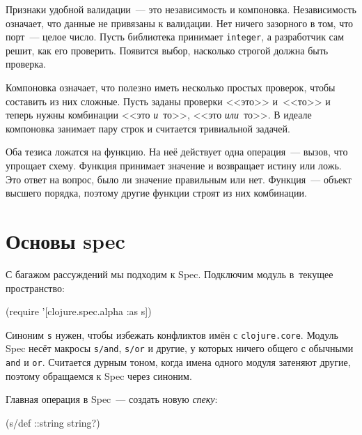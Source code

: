 
Признаки удобной валидации~--- это независимость и компоновка. Независимость
означает, что данные не привязаны к валидации. Нет ничего зазорного в том, что
порт~--- целое число. Пусть библиотека принимает \verb|integer|, а разработчик
сам решит, как его проверить. Появится выбор, насколько строгой должна быть
проверка.


Компоновка означает, что полезно иметь несколько простых проверок, чтобы
составить из них сложные. Пусть заданы проверки <<это>> и~<<то>> и теперь нужны
комбинации <<это \emph{и}~то>>, <<это \emph{или}~то>>. В идеале компоновка
занимает пару строк и считается тривиальной задачей.


Оба тезиса ложатся на функцию. На неё действует одна операция~--- вызов, что
упрощает схему. Функция принимает значение и возвращает истину или ложь. Это
ответ на вопрос, было ли значение правильным или нет. Функция~--- объект высшего
порядка, поэтому другие функции строят из них комбинации.

\section{Основы spec}

С багажом рассуждений мы подходим к Spec. Подключим модуль в~текущее
пространство:

\begin{english}
  \begin{clojure}
(require '[clojure.spec.alpha :as s])
  \end{clojure}
\end{english}

Синоним \verb|s| нужен, чтобы избежать конфликтов имён с
\verb|clojure.core|. Модуль Spec несёт макросы \verb|s/and|, \verb|s/or| и
другие, у которых ничего общего с обычными \verb|and| и \verb|or|. Считается
дурным тоном, когда имена одного модуля затеняют другие, поэтому обращаемся к
Spec через синоним.


Главная операция в Spec~--- создать новую \emph{спеку}:

\begin{english}
  \begin{clojure}
(s/def ::string string?)
  \end{clojure}
\end{english}

